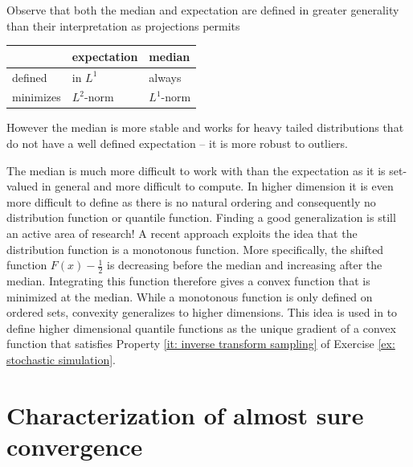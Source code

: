 \begin{remark}
    Observe that both the median and expectation are defined in greater
    generality than their interpretation as projections permits
    \begin{center}
       \def\arraystretch{1.2} 
    \begin{tabular}{l|ll}
        & expectation & median 
        \\
        \hline
        defined & in \(L^1\) & always
        \\
        minimizes & \(L^2\)-norm & \(L^1\)-norm
    \end{tabular}
    \end{center}
    However the median is more stable and works for heavy tailed
    distributions that do not have a well defined expectation -- it is
    more robust to outliers.
\end{remark}

\begin{remark}
    The median is much more difficult to work with than the expectation
    as it is set-valued in general and more difficult to compute.
    In higher dimension it is even more difficult to define as there is no
    natural ordering and consequently no distribution function or quantile
    function. Finding a good generalization is still an active area of
    research! A recent approach \citep{hallinDistributionQuantileFunctions2021}
    exploits the idea that the distribution function is a monotonous function.
    More specifically, the shifted function \(F(x) - \frac12\) is decreasing
    before the median and increasing after the median. Integrating this function
    therefore gives a convex function that is minimized at the median.
    While a monotonous function is only defined on ordered sets, convexity
    generalizes to higher dimensions. This idea is used in
    \citep{hallinDistributionQuantileFunctions2021} to define higher dimensional
    quantile functions as the unique gradient of a convex function
    that satisfies Property \ref{it: inverse transform sampling} of Exercise \ref{ex:
    stochastic simulation}.
\end{remark}

\section{Characterization of almost sure convergence}
\label{sec: borel cantelli}



